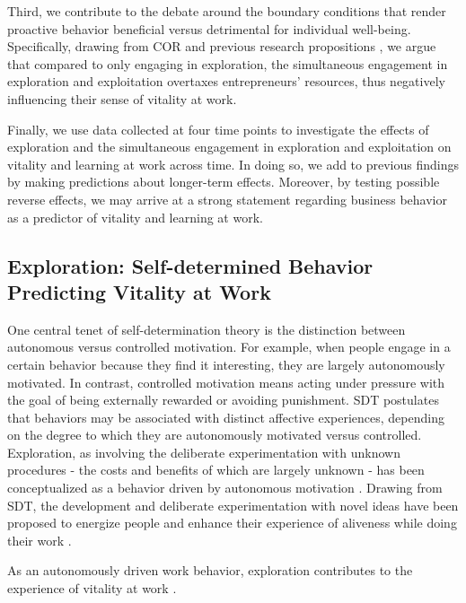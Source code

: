 \documentclass[man, 12pt, a4paper, noextraspace]{apa6}
\begin{document}
Third, we contribute to the debate around the boundary conditions that render proactive behavior beneficial versus detrimental for individual well-being. 
Specifically, drawing from COR \parencite{Hobfoll.1989} and previous research propositions \parencite{Hunter2017}, we argue that compared to only engaging in exploration, the simultaneous engagement in exploration and exploitation overtaxes entrepreneurs' resources, thus negatively influencing their sense of vitality at work.  \par 

Finally, we use data collected at four time points to investigate the effects of exploration and the simultaneous engagement in exploration and exploitation on vitality and learning at work across time.
In doing so, we add to previous findings \parencite[e.g.,][]{Niessen.2012} by making predictions about longer-term effects. 
Moreover, by testing possible reverse effects, we may arrive at a strong statement regarding business behavior as a predictor of vitality and learning at work. 

\subsection{Exploration: Self-determined Behavior Predicting Vitality at Work}

One central tenet of self-determination theory \parencite[SDT]{Ryan.2001} is the distinction between autonomous versus controlled motivation. 
For example, when people engage in a certain behavior because they find it interesting, they are largely autonomously motivated. 
In contrast, controlled motivation means acting under pressure with the goal of being externally rewarded or avoiding punishment. 
SDT postulates that behaviors may be associated with distinct affective experiences, depending on the degree to which they are autonomously motivated versus controlled.
Exploration, as involving the deliberate experimentation with unknown procedures - the costs and benefits of which are largely unknown - has been conceptualized as a behavior driven by autonomous motivation \parencite{Ryan.1997}.
Drawing from SDT, the development and deliberate experimentation with novel ideas have been proposed to energize people and enhance their experience of aliveness while doing their work \parencite{Spreitzer.2005b}.


As an autonomously driven work behavior, exploration contributes to the experience of vitality at work \parencite{Ryan.1997}.
\end{document}

